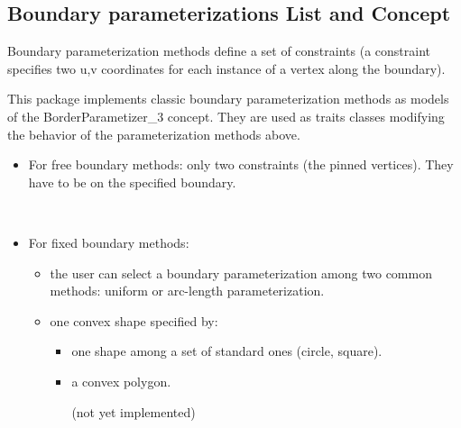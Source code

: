 \subsection{Boundary parameterizations List and Concept}

Boundary parameterization methods define a
set of constraints (a constraint specifies two u,v coordinates for
each instance of a vertex along the boundary).

This package implements classic boundary parameterization methods
as models of the BorderParametizer\_3 concept. They are used as traits classes
modifying the behavior of the parameterization methods above.

\begin{itemize}

\item For free boundary methods: only two constraints (the pinned
vertices). They have to be on the specified boundary.

  \\

\item For fixed boundary methods:

    \begin{itemize}

    \item the user can select a boundary
        parameterization among two common methods: uniform or
        arc-length parameterization.

    \item one convex shape specified by:

        \begin{itemize}

        \item one shape among a set of standard ones (circle, square).

        \item a convex polygon.

        (not yet implemented)

        \end{itemize}

    \end{itemize}

      \\
      \\
      \\
      \\

\end{itemize}


